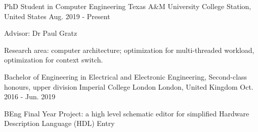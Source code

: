 
\begin{cventries}
\cventry
    {PhD Student in Computer Engineering} %
    {Texas A\&M University} %
    {College Station, United States} %
    {Aug. 2019 - Present} %
    {
      \begin{cvitems} %
         \item {Advisor: Dr Paul Gratz}
         \item {Research area: computer architecture; optimization for multi-threaded workload, optimization for context switch.}
      \end{cvitems}
    }
  \cventry
    {Bachelor of Engineering in Electrical and Electronic Engineering, Second-class honours, upper division} %
    {Imperial College London} %
    {London, United Kingdom} %
    {Oct. 2016 - Jun. 2019} %
    {
      \begin{cvitems} %
         \item {BEng Final Year Project: a high level schematic editor for simplified Hardware Description Language (HDL) Entry}
      \end{cvitems}
    }
\end{cventries}
